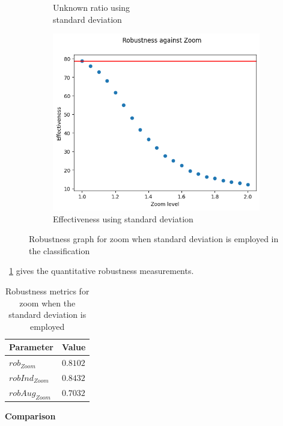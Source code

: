 \begin{figure}[h]
\begin{subfigure}{.33\textwidth}
		\caption{Unknown ratio using \\ standard deviation}
		\label{fig:co_vu_unkn}
	\end{subfigure}%
	\begin{subfigure}{.33\textwidth}
		\centering
		\includegraphics[width=0.9\linewidth]{ImageFiles/EvalBNN/ZO/VU/eff}
		\caption{Effectiveness using standard deviation}
		\label{fig:zo_vu_eff}
	\end{subfigure}
	\caption{Robustness graph for zoom when standard deviation is employed in the classification}
	\label{fig:zo_vu}
\end{figure}

\Tab~\ref{table:rob_zo_vu} gives the quantitative robustness measurements.

\begin{table}[h]
	\centering
	\begin{tabular}{|| l | l ||} 
		\hline
		\textbf{Parameter} & \textbf{Value} \\
		\hline
		\hline
		$rob_{Zoom}$ & $0.8102$ \\
		$robInd_{Zoom}$ & $0.8432$ \\
		$robAug_{Zoom}$ & $0.7032$ \\	
		\hline
	\end{tabular}	
	\caption{Robustness metrics for zoom when the standard deviation is employed}
	\label{table:rob_zo_vu}
\end{table}

\vspace{0.3cm}
\textbf{Comparison}
\vspace{0.1cm}

